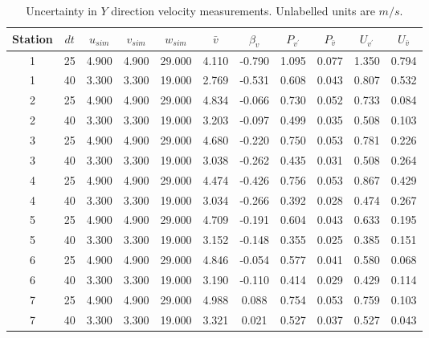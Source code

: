 \begin{table}[H]
\begin{center}
\begin{tabular}{|ccccccccccc|}
	\hline
	Station & $dt$ & $u_{sim}$ & $v_{sim}$ & $w_{sim}$ & $\bar{v}$ & $\beta_v$ & $P_{v^{\prime}}$ & $P_{\bar{v}}$ & $U_{v^{\prime}}$ & $U_{\bar{v}}$\\
	\hline
	1 & 25 & 4.900 & 4.900 & 29.000 & 4.110 & -0.790 & 1.095 & 0.077 & 1.350 & 0.794\\
	1 & 40 & 3.300 & 3.300 & 19.000 & 2.769 & -0.531 & 0.608 & 0.043 & 0.807 & 0.532\\
	2 & 25 & 4.900 & 4.900 & 29.000 & 4.834 & -0.066 & 0.730 & 0.052 & 0.733 & 0.084\\
	2 & 40 & 3.300 & 3.300 & 19.000 & 3.203 & -0.097 & 0.499 & 0.035 & 0.508 & 0.103\\
	3 & 25 & 4.900 & 4.900 & 29.000 & 4.680 & -0.220 & 0.750 & 0.053 & 0.781 & 0.226\\
	3 & 40 & 3.300 & 3.300 & 19.000 & 3.038 & -0.262 & 0.435 & 0.031 & 0.508 & 0.264\\
	4 & 25 & 4.900 & 4.900 & 29.000 & 4.474 & -0.426 & 0.756 & 0.053 & 0.867 & 0.429\\
	4 & 40 & 3.300 & 3.300 & 19.000 & 3.034 & -0.266 & 0.392 & 0.028 & 0.474 & 0.267\\
	5 & 25 & 4.900 & 4.900 & 29.000 & 4.709 & -0.191 & 0.604 & 0.043 & 0.633 & 0.195\\
	5 & 40 & 3.300 & 3.300 & 19.000 & 3.152 & -0.148 & 0.355 & 0.025 & 0.385 & 0.151\\
	6 & 25 & 4.900 & 4.900 & 29.000 & 4.846 & -0.054 & 0.577 & 0.041 & 0.580 & 0.068\\
	6 & 40 & 3.300 & 3.300 & 19.000 & 3.190 & -0.110 & 0.414 & 0.029 & 0.429 & 0.114\\
	7 & 25 & 4.900 & 4.900 & 29.000 & 4.988 & 0.088 & 0.754 & 0.053 & 0.759 & 0.103\\
	7 & 40 & 3.300 & 3.300 & 19.000 & 3.321 & 0.021 & 0.527 & 0.037 & 0.527 & 0.043\\
	\hline
\end{tabular}
\caption{Uncertainty in $Y$ direction velocity measurements. Unlabelled units are $m/s$.}
\label{table:uncertainties_v}
\end{center}
\end{table}
